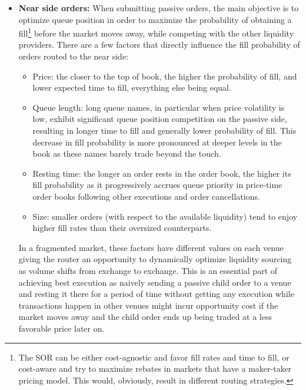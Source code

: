 \begin{itemize}
\item \textbf{Near side orders:} When submitting passive orders, the main objective is to optimize queue position in order to maximize the probability of obtaining a fill\footnote{The SOR can be either cost-agnostic and favor fill rates and time to fill, or cost-aware and try to maximize rebates in markets that have a maker-taker pricing model. This would, obviously, result in different routing strategies.} before the market moves away, while competing with the other liquidity providers. There are a few factors that directly influence the fill probability of orders routed to the near side:


\begin{itemize}
\item Price: the closer to the top of book, the higher the probability of fill, and lower expected time to fill, everything else being equal.

\item Queue length: long queue names, in particular when price volatility is low, exhibit significant queue position competition on the passive side, resulting in longer time to fill and generally lower probability of fill. This decrease in fill probability is more pronounced at deeper levels in the book as these names barely trade beyond the touch. 

\item Resting time: the longer an order rests in the order book, the higher its fill probability as it progressively accrues queue priority in price-time order books following other executions and order cancellations.

\item Size: smaller orders (with respect to the available liquidity) tend to enjoy higher fill rates than their oversized counterparts.
\end{itemize}


In a fragmented market, these factors have different values on each venue giving the router an opportunity to dynamically optimize liquidity sourcing as volume shifts from exchange to exchange. This is an essential part of achieving best execution as naively  sending a passive child order to a venue and resting it there for a period of time without getting any execution while transactions happen in other venues might incur opportunity cost if the market moves away and the child order ends up being traded at a less favorable price later on. \twomedskip



\end{itemize}
